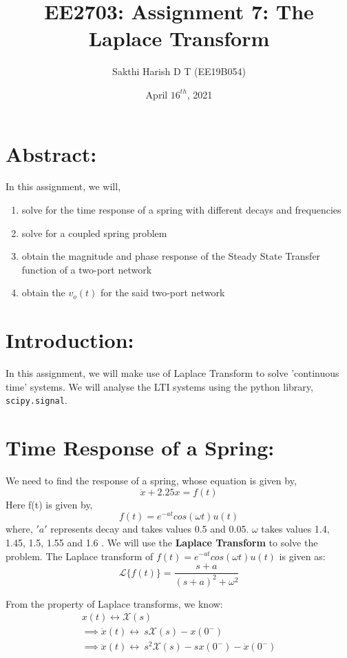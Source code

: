 \documentclass[11pt, a4paper]{article}
\title{EE2703: Assignment 7: The Laplace Transform}
\author{Sakthi Harish D T (EE19B054)}
\date{April $16^{th}$, 2021}
\begin{document}
\maketitle
\section{Abstract:}
In this assignment, we will,
\begin{enumerate}
    \item solve for the time response of a spring with different decays and frequencies
    \item solve for a coupled spring problem
    \item obtain the magnitude and phase response of the Steady State Transfer function of a two-port network
    \item obtain the $v_o(t)$ for the said two-port network
\end{enumerate}
\section{Introduction:}
    In this assignment, we will make use of Laplace Transform to solve 
    'continuous time' systems. We will analyse the LTI systems using the python library, \texttt{scipy.signal}. 

\section{Time Response of a Spring:}
    We need to find the response of a spring, whose equation is given by,
    \begin{equation*}
        \ddot{x} + 2.25x = f(t)
    \end{equation*}
    Here f(t) is given by,
    \begin{equation*}
        f(t) = e^{-at}cos(\omega t)u(t)
    \end{equation*}
    where, $'a'$ represents decay and takes values 0.5 and 0.05. $\omega$ takes values 1.4, 1.45, 1.5, 1.55 and 1.6 . \newline
    We will use the \textbf{Laplace Transform} to solve the problem.\newline
        The Laplace transform of $f(t) = e^{-at}cos(\omega t)u(t)$ is given as:
        \begin{equation*}
            \mathcal{L}\{f(t)\} = \frac{s+a}{(s+a)^2 + \omega^2}
        \end{equation*}

        From the property of Laplace transforms, we know:
        \begin{gather*}
            x(t) \longleftrightarrow \mathcal{X}(s)\\
            \implies \dot{x}(t) \longleftrightarrow \ s\mathcal{X}(s) - x(0^-)\\
            \implies \ddot{x}(t) \longleftrightarrow \ s^2\mathcal{X}(s) - sx(0^-)-\dot{x}(0^-)
        \end{gather*}
\end{document}
